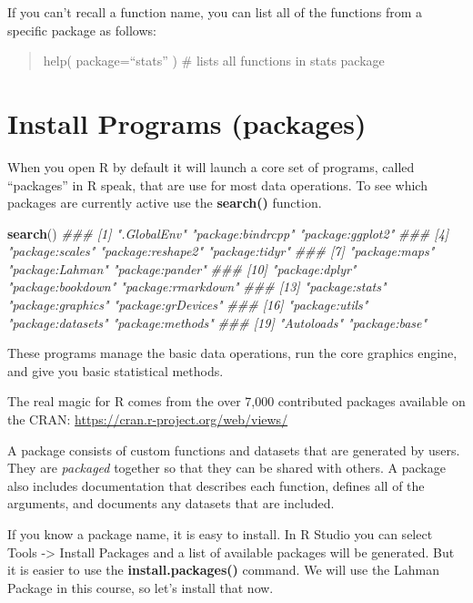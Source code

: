 \documentclass[]{book}
\newenvironment{Shaded}{\begin{snugshade}}{\end{snugshade}}
\newcommand{\CommentTok}[1]{\textcolor[rgb]{0.56,0.35,0.01}{\textit{#1}}}
\newcommand{\KeywordTok}[1]{\textcolor[rgb]{0.13,0.29,0.53}{\textbf{#1}}}
\newcommand{\NormalTok}[1]{#1}
\theoremstyle{definition}
\theoremstyle{definition}
\theoremstyle{definition}
\theoremstyle{remark}
\begin{document}
If you can't recall a function name, you can list all of the functions
from a specific package as follows:

\begin{quote}
help( package=``stats'' ) \# lists all functions in stats package
\end{quote}

\hypertarget{install-programs-packages}{%
\section{Install Programs (packages)}\label{install-programs-packages}}

When you open R by default it will launch a core set of programs, called
``packages'' in R speak, that are use for most data operations. To see
which packages are currently active use the \textbf{search()} function.

\begin{Shaded}
\begin{Highlighting}[]
\KeywordTok{search}\NormalTok{()}
\CommentTok{###  [1] ".GlobalEnv"        "package:bindrcpp"  "package:ggplot2"  }
\CommentTok{###  [4] "package:scales"    "package:reshape2"  "package:tidyr"    }
\CommentTok{###  [7] "package:maps"      "package:Lahman"    "package:pander"   }
\CommentTok{### [10] "package:dplyr"     "package:bookdown"  "package:rmarkdown"}
\CommentTok{### [13] "package:stats"     "package:graphics"  "package:grDevices"}
\CommentTok{### [16] "package:utils"     "package:datasets"  "package:methods"  }
\CommentTok{### [19] "Autoloads"         "package:base"}
\end{Highlighting}
\end{Shaded}

These programs manage the basic data operations, run the core graphics
engine, and give you basic statistical methods.

The real magic for R comes from the over 7,000 contributed packages
available on the CRAN: \url{https://cran.r-project.org/web/views/}

A package consists of custom functions and datasets that are generated
by users. They are \emph{packaged} together so that they can be shared
with others. A package also includes documentation that describes each
function, defines all of the arguments, and documents any datasets that
are included.

If you know a package name, it is easy to install. In R Studio you can
select Tools -\textgreater{} Install Packages and a list of available
packages will be generated. But it is easier to use the
\textbf{install.packages()} command. We will use the Lahman Package in
this course, so let's install that now.
\end{document}

